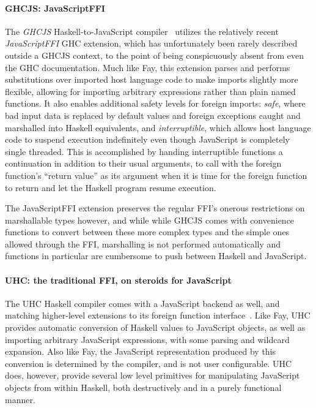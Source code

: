 \documentclass[preprint]{sigplanconf}
\begin{document}
\paragraph{GHCJS: JavaScriptFFI}
The \emph{GHCJS} Haskell-to-JavaScript compiler\ \cite{ghcjs} utilizes the
relatively recent \emph{JavaScriptFFI} GHC extension,
which has unfortunately been rarely described outside a GHCJS context, to the
point of being conspicuously absent from even the GHC documentation.
Much like Fay, this extension parses and
performs substitutions over imported host language code to make imports
slightly more flexible, allowing for importing arbitrary expressions rather
than plain named functions.
It also enables additional safety levels for foreign
imports: \emph{safe}, where bad input data is replaced by default values and
foreign exceptions caught and marshalled into Haskell equivalents,
and \emph{interruptible}, which allows host language code to suspend execution
indefinitely even though JavaScript is completely single threaded.
This is accomplished by handing interruptible functions a continuation in
addition to their usual arguments, to call with the foreign function's
``return value'' as its argument when it is time for the foreign function
to return and let the Haskell program resume execution.

The JavaScriptFFI extension preserves the regular FFI's onerous restrictions
on marshallable types however, and while while GHCJS comes with convenience
functions to convert between these more complex types and the simple ones
allowed through the FFI, marshalling is not performed automatically and
functions in particular are cumbersome to push between Haskell and JavaScript.

\paragraph{UHC: the traditional FFI, on steroids for JavaScript}
The UHC Haskell compiler comes with a JavaScript backend as well, and matching
higher-level extensions to its foreign function interface\ \cite{uhc}.
Like Fay, UHC provides automatic conversion of Haskell values to JavaScript
objects, as well as importing arbitrary JavaScript expressions, with some
parsing and wildcard expansion.
Also like Fay, the JavaScript representation produced by this
conversion is determined by the compiler, and is not user configurable.
UHC does, however, provide several low level primitives for manipulating
JavaScript objects from within Haskell, both destructively and in a purely
functional manner.
\end{document}
